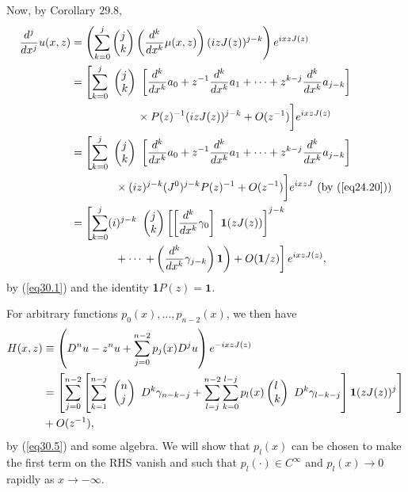\documentclass{surv-l}
\theoremstyle{plain}
\theoremstyle{definition}
\numberwithin{equation}{chapter}
\begin{document}
Now, by Corollary $29.8$,
\begin{align}\label{eq30.5}
\frac{d^{j}}{dx^{j}}u(x, z)&=\left(\sum_{k=0}^{j} \left(\begin{array}{@{}l@{}}
j\\
k
\end{array}\right) \left(\frac{d^{k}}{dx^{k}}\mu(x, z)\right)(izJ(z))^{j-k}\right)e^{ixzJ(z)}\\ \notag
&=\left[\sum_{k=0}^{j}\ \left(\begin{array}{@{}l@{}}
j\\
k
\end{array}\right)\ \left[\frac{d^{k}}{dx^{k}}a_{0}+z^{-1}\frac{d^{k}}{dx^{k}}a_{1}+\cdots +z^{k-j}\frac{d^{k}}{dx^{k}}a_{j-k}\right]\right.\\ \notag
&\qquad\qquad\qquad\times P(z)^{-1}(izJ(z))^{j-k}+O(z^{-1})\bigg]e^{ixzJ(z)}\\ \notag
&=\left[\sum_{k=0}^{j}\ \left(\begin{array}{@{}l@{}}
j\\
k
\end{array}\right)\ \left[\frac{d^{k}}{dx^{k}}a_{0}+z^{-1}\frac{d^{k}}{dx^{k}}a_{1}+\cdots +z^{k-j}\frac{d^{k}}{dx^{k}}a_{j-k}\right]\right.\\ \notag
& \qquad\quad\quad \times(iz)^{j-k}(J^{0})^{j-k}P(z)^{-1}+O(z^{-1})\bigg]e^{ixzJ} \text{ (by (\ref{eq24.20}))}\\ \notag
&=\left[\sum_{k=0}^{j}(i)^{j-k}\ \left(\begin{array}{@{}l@{}}
j\\
k
\end{array}\right) \left[\left[\frac{d^{k}}{dx^{k}}\gamma_{0}\right]\ \mathbf{1} (zJ(z))\right]^{j-k}\right.\\ \notag
&\qquad\qquad+\cdots \left.\left.+\left(\frac{d^{k}}{dx^{k}}\gamma_{j-k}\right)\mathbf{1}\right)+O(\mathbf{1}/z)\right]e^{ixzJ(z)},
\end{align}
by (\ref{eq30.1}) and the identity \textbf{1}$P(z)=\textbf{1}$.

For arbitrary functions $ p_{0}(x),\ldots,p_{n-2}(x)$, we then have
\begin{align*}
H(x, z)\displaystyle &\equiv \left(D^{n}u-z^{n}u+\sum_{j=0}^{n-2}p_{j}(x)D^{j}u\right)e^{-ixzJ(z)}\\
&=\left[\sum_{j=0}^{n-2}\left[\sum_{k=1}^{n-j}\ \left(\begin{array}{@{}l@{}}
n\\
j
\end{array}\right)\ D^{k}\gamma_{n-k-j}+\sum_{l=j}^{n-2}\sum_{k=0}^{l-j}p_{l}(x) \left(\begin{array}{@{}l@{}}
l\\
k
\end{array}\right)\ D^{k}\gamma_{l-k-j}\right]\mathbf{1}(zJ(z))^{j}\right]\\
&+O(z^{-1}),
\end{align*}
by (\ref{eq30.5}) and some algebra. We will show that $p_{l}(x)$ can be chosen to make the first term on the RHS vanish and such that $p_{l}(\cdot)\in C^{\infty}$ and $p_{l}(x)\rightarrow 0$ rapidly as $ x\rightarrow-\infty$.
\end{document}
